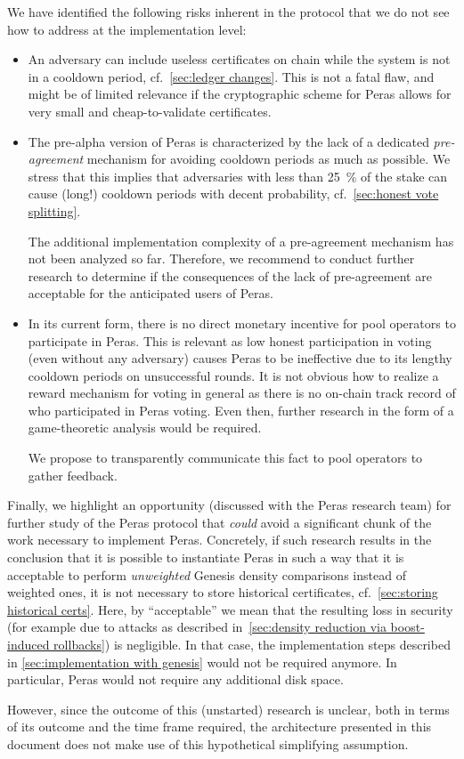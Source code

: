 We have identified the following risks inherent in the protocol that we do not see how to address at the implementation level:
\begin{itemize}
\item
  An adversary can include useless certificates on chain while the system is not in a cooldown period, cf.~\cref{sec:ledger changes}.
  This is not a fatal flaw, and might be of limited relevance if the cryptographic scheme for Peras allows for very small and cheap-to-validate certificates.
\item
  The pre-alpha version of Peras is characterized by the lack of a dedicated \emph{pre-agreement} mechanism for avoiding cooldown periods as much as possible.
  We stress that this implies that adversaries with less than \qty{25}{\percent} of the stake can cause (long!) cooldown periods with decent probability, cf.~\cref{sec:honest vote splitting}.

  The additional implementation complexity of a pre-agreement mechanism has not been analyzed so far.
  Therefore, we recommend to conduct further research to determine if the consequences of the lack of pre-agreement are acceptable for the anticipated users of Peras.
\item
  In its current form, there is no direct monetary incentive for pool operators to participate in Peras.
  This is relevant as low honest participation in voting (even without any adversary) causes Peras to be ineffective due to its lengthy cooldown periods on unsuccessful rounds.
  It is not obvious how to realize a reward mechanism for voting in general as there is no on-chain track record of who participated in Peras voting.
  Even then, further research in the form of a game-theoretic analysis would be required.

  We propose to transparently communicate this fact to pool operators to gather feedback.
\end{itemize}

Finally, we highlight an opportunity (discussed with the Peras research team) for further study of the Peras protocol that \emph{could} avoid a significant chunk of the work necessary to implement Peras.
Concretely, if such research results in the conclusion that it is possible to instantiate Peras in such a way that it is acceptable to perform \emph{unweighted} Genesis density comparisons instead of weighted ones, it is not necessary to store historical certificates, cf.~\cref{sec:storing historical certs}.
Here, by \enquote{acceptable} we mean that the resulting loss in security (for example due to attacks as described in~\cref{sec:density reduction via boost-induced rollbacks}) is negligible.
In that case, the implementation steps described in \cref{sec:implementation with genesis} would not be required anymore.
In particular, Peras would not require any additional disk space.

However, since the outcome of this (unstarted) research is unclear, both in terms of its outcome and the time frame required, the architecture presented in this document does not make use of this hypothetical simplifying assumption.

